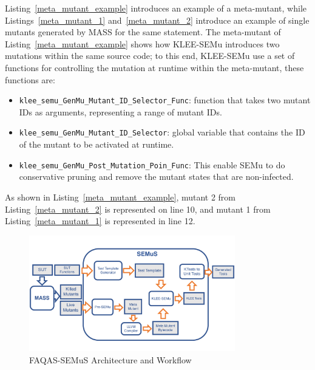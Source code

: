 

Listing~\ref{meta_mutant_example} introduces an example of a meta-mutant, while Listings~\ref{meta_mutant_1} and~\ref{meta_mutant_2} introduce an example of single mutants generated by MASS for the same statement.
The meta-mutant of Listing~\ref{meta_mutant_example} shows how KLEE-SEMu introduces two mutations within the same source code; to this end, KLEE-SEMu use a set of functions for controlling the mutation at runtime within the meta-mutant, these functions are:

\begin{itemize}
	\item \texttt{klee\_semu\_GenMu\_Mutant\_ID\_Selector\_Func}: function that takes two mutant IDs as arguments, representing a range of mutant IDs.
    \item \texttt{klee\_semu\_GenMu\_Mutant\_ID\_Selector}: global variable that contains the ID of the mutant to be activated at runtime.
	\item \texttt{klee\_semu\_GenMu\_Post\_Mutation\_Poin\_Func}: This enable SEMu to do conservative pruning and remove the mutant states that are non-infected.
\end{itemize}

As shown in Listing~\ref{meta_mutant_example}, mutant 2 from Listing~\ref{meta_mutant_2} is represented on line 10, and mutant 1 from Listing~\ref{meta_mutant_1} is represented in line 12.


\begin{figure}[tb]
\begin{center}
\includegraphics[width=0.8\textwidth]{images/semus-architecture}
\caption{FAQAS-SEMuS Architecture and Workflow}
\label{fig:semus_architecture}
\end{center}
\end{figure}

